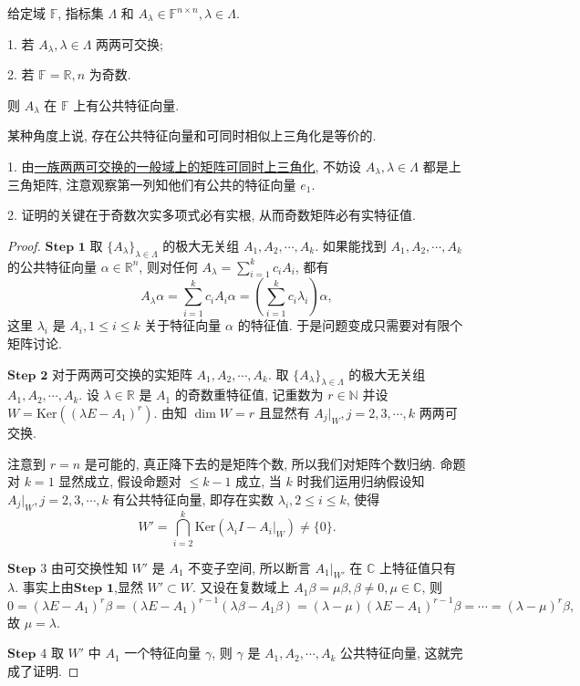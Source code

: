 \documentclass[../../main.tex]{subfiles}%
\begin{document}
\begin{theorem}[公共特征值]\label{theorem:公共特征值}
给定域 \( \mathbb{F} \), 指标集 \( \Lambda \) 和 \( A_\lambda \in \mathbb{F}^{n \times n}, \lambda \in \Lambda \).

1. 若 \( A_\lambda, \lambda \in \Lambda \) 两两可交换;

2. 若 \( \mathbb{F} = \mathbb{R}, n \) 为奇数.

则 \( A_\lambda \) 在 \( \mathbb{F} \) 上有公共特征向量.
\end{theorem}
\begin{note}
某种角度上说, 存在公共特征向量和可同时相似上三角化是等价的.

1. 由\hyperref[proposition:一族两两可交换的一般域上的矩阵可同时上三角化]{一族两两可交换的一般域上的矩阵可同时上三角化}, 不妨设 \( A_\lambda, \lambda \in \Lambda \) 都是上三角矩阵, 注意观察第一列知他们有公共的特征向量 \( e_1 \).

2. 证明的关键在于奇数次实多项式必有实根, 从而奇数矩阵必有实特征值.
\end{note}
\begin{proof} 
$\mathbf{Step}\,\,\mathbf{1}$ 取 \( \{A_\lambda\}_{\lambda \in \Lambda} \) 的极大无关组 \( A_1, A_2, \cdots, A_k \). 如果能找到 \( A_1, A_2, \cdots, A_k \) 的公共特征向量 \( \alpha \in \mathbb{R}^n \), 则对任何 \( A_\lambda = \sum_{i=1}^k c_i A_i \), 都有
\[
A_\lambda \alpha = \sum_{i=1}^k c_i A_i \alpha = \left( \sum_{i=1}^k c_i \lambda_i \right) \alpha,
\]
这里 \( \lambda_i \) 是 \( A_i, 1 \leqslant i \leqslant k \) 关于特征向量 \( \alpha \) 的特征值. 于是问题变成只需要对有限个矩阵讨论.

$\mathbf{Step}\,\,\mathbf{2}$ 对于两两可交换的实矩阵 \( A_1, A_2, \cdots, A_k \). 取 \( \{A_\lambda\}_{\lambda \in \Lambda} \) 的极大无关组 \( A_1, A_2, \cdots, A_k \). 设 \( \lambda \in \mathbb{R} \) 是 \( A_1 \) 的奇数重特征值, 记重数为 \( r \in \mathbb{N} \) 并设 \( W = \mathrm{Ker} \left( (\lambda E - A_1)^r \right) \). 由知 \( \dim W = r \) 且显然有 \( A_j|_W, j = 2, 3, \cdots, k \) 两两可交换.

注意到 \( r = n \) 是可能的, 真正降下去的是矩阵个数, 所以我们对矩阵个数归纳. 命题对 \( k = 1 \) 显然成立, 假设命题对 \( \leqslant k - 1 \) 成立, 当 \( k \) 时我们运用归纳假设知 \( A_j|_W, j = 2, 3, \cdots, k \) 有公共特征向量, 即存在实数 \( \lambda_i, 2 \leqslant i \leqslant k \), 使得
\[
W' = \bigcap_{i=2}^k \mathrm{Ker} \left( \lambda_i I - A_i|_W \right) \neq \{0\}.
\]

$\mathbf{Step}\,\,3$ 由可交换性知 \( W' \) 是 \( A_1 \) 不变子空间, 所以断言 \( A_1|_{W'} \) 在 \( \mathbb{C} \) 上特征值只有 \( \lambda \). 事实上由$\mathbf{Step}\,\,\mathbf{1}$,显然 \( W' \subset W \). 又设在复数域上 \( A_1 \beta = \mu \beta, \beta \neq 0, \mu \in \mathbb{C} \), 则
\[
0 = (\lambda E - A_1)^r \beta = (\lambda E - A_1)^{r - 1} (\lambda \beta - A_1 \beta) = (\lambda - \mu)(\lambda E - A_1)^{r - 1} \beta = \cdots = (\lambda - \mu)^r \beta,
\]
故 \( \mu = \lambda \).

$\mathbf{Step}\,\,4$ 取 \( W' \) 中 \( A_1 \) 一个特征向量 \( \gamma \), 则 \( \gamma \) 是 \( A_1, A_2, \cdots, A_k \) 公共特征向量, 这就完成了证明.
\end{proof}
\end{document}

